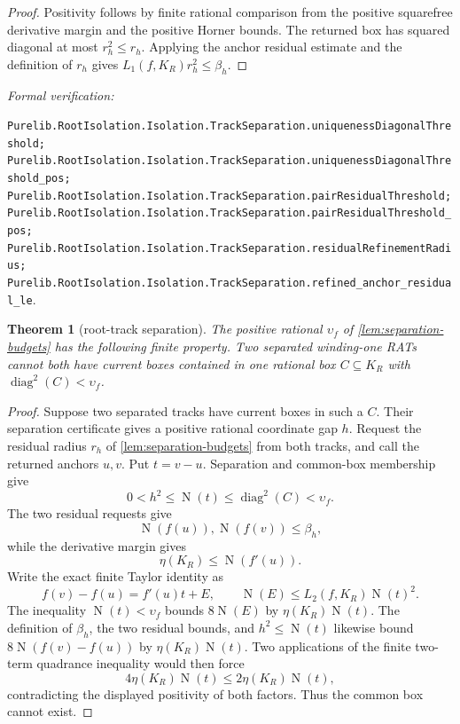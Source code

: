 \documentclass[11pt]{article}
\newtheorem{theorem}{Theorem}[section]
\newcommand{\Norm}[1]{\operatorname{N}\!\left(#1\right)}
\newcommand{\diamq}{\operatorname{diag}^{2}}
\newcommand{\leanref}[1]{\par\smallskip\noindent
  \emph{Formal verification:}\par\nobreak
  {\raggedright\nolinkurl{#1}.\par}}
\begin{document}
\begin{proof}
Positivity follows by finite rational comparison from the positive
squarefree derivative margin and the positive Horner bounds.  The returned
box has squared diagonal at most $r_h^2\le r_h$.  Applying the anchor
residual estimate and the definition of $r_h$ gives
$L_1(f,K_R)r_h^2\le\beta_h$.
\end{proof}

\leanref{Purelib.RootIsolation.Isolation.TrackSeparation.uniquenessDiagonalThreshold;
Purelib.RootIsolation.Isolation.TrackSeparation.uniquenessDiagonalThreshold_pos;
Purelib.RootIsolation.Isolation.TrackSeparation.pairResidualThreshold;
Purelib.RootIsolation.Isolation.TrackSeparation.pairResidualThreshold_pos;
Purelib.RootIsolation.Isolation.TrackSeparation.residualRefinementRadius;
Purelib.RootIsolation.Isolation.TrackSeparation.refined_anchor_residual_le}

\begin{theorem}[root-track separation]
\label{thm:root-separation}
The positive rational $\upsilon_f$ of
\cref{lem:separation-budgets} has the following finite property.  Two
separated winding-one RATs cannot both have current boxes contained in one
rational box $C\subseteq K_R$ with
$\diamq(C)<\upsilon_f$.
\end{theorem}

\begin{proof}
Suppose two separated tracks have current boxes in such a $C$.  Their
separation certificate gives a positive rational coordinate gap $h$.
Request the residual radius $r_h$ of
\cref{lem:separation-budgets} from both tracks, and call the returned anchors
$u,v$.  Put $t=v-u$.  Separation and common-box membership give
\[
             0<h^2\le\Norm t\le\diamq(C)<\upsilon_f.
\]
The two residual requests give
\[
                       \Norm{f(u)},\Norm{f(v)}\le\beta_h,
\]
while the derivative margin gives
\[
             \eta(K_R)\le\Norm{f'(u)}.
\]
Write the exact finite Taylor identity as
\[
             f(v)-f(u)=f'(u)t+E,
 \qquad
             \Norm E\le L_2(f,K_R)\Norm t^2.
\]
The inequality $\Norm t<\upsilon_f$ bounds $8\Norm E$ by
$\eta(K_R)\Norm t$.  The definition of $\beta_h$, the two residual bounds,
and $h^2\le\Norm t$ likewise bound
$8\Norm{f(v)-f(u)}$ by $\eta(K_R)\Norm t$.  Two applications of the finite
two-term quadrance inequality would then force
\[
 4\eta(K_R)\Norm t\le2\eta(K_R)\Norm t,
\]
contradicting the displayed positivity of both factors.  Thus the common
box cannot exist.
\end{proof}
\end{document}

